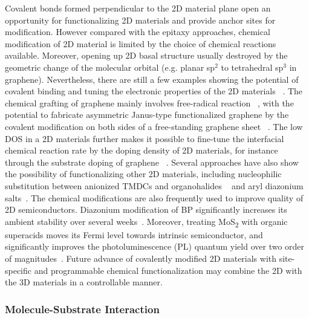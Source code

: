 Covalent bonds formed perpendicular to the 2D material plane open an
opportunity for functionalizing 2D materials and provide anchor sites
for modification. However compared with the epitaxy approaches,
chemical modification of 2D material is limited by the choice of
chemical reactions available. Moreover, opening up 2D basal structure
usually destroyed by the geometric change of the molecular orbital
(e.g. planar sp\(^{\text{2}}\) to tetrahedral sp\(^{\text{3}}\) in
graphene). Nevertheless, there are still a few examples showing the
potential of covalent binding and tuning the electronic properties of
the 2D materials
~\cite{Georgakilas_2012_noncoval_gr_rev,Lee_2011_tempo_gr,Zhang_2013_janus_gr,Voiry_2014_cov_TMDC_phase,Vishnoi_2016_ar_mos2_covalent,Liu_2011_rev_chem_dope_gr,Wang_2012_ar_gr_react_rate}.
%
The chemical grafting of graphene mainly involves free-radical
reaction
~\cite{Lee_2011_tempo_gr,Choi_2010_aminotempo_gr,Zhang_2013_janus_gr,Wang_2012_ar_gr_react_rate,Kumar_2014_2D_MOF_gr},
%
with the potential to fabricate asymmetric Janus-type functionalized
graphene by the covalent modification on both sides of a free-standing
graphene sheet ~\cite{Zhang_2013_janus_gr}. The low DOS in a 2D
materials further makes it possible to fine-tune the interfacial
chemical reaction rate by the doping density of 2D materials, for
instance through the substrate doping of graphene
~\cite{Wang_2012_ar_gr_react_rate}. Several approaches have also show
the possibility of functionalizing other 2D materials, including
nucleophilic substitution between anionized TMDCs and organohalides
~\cite{Vishnoi_2016_ar_mos2_covalent} and aryl diazonium
salts~\cite{Ryder_2016_TMDC_ad,Ryder_2016_phosphorene_ad}. The chemical modifications are also
frequently used to improve quality of 2D semiconductors.
%
Diazonium modification of BP significantly increases its ambient
stability over several
weeks~\cite{Ryder_2016_phosphorene_ad}. Moreover, treating
MoS\textsubscript{2} with organic super\-acids moves its Fermi level
towards intrinsic semiconductor, and significantly improves the
photo\-luminescence (PL) quantum yield over two order of
magnitudes~\cite{Amani_2015_mos2_QY1}.
%
Future advance of covalently
modified 2D materials with site-specific and programmable chemical
functionalization may combine the 2D with the 3D materials in a
controllable manner.

\subsubsection{Molecule-Substrate Interaction}
\label{sec:intro-mol-subst}

